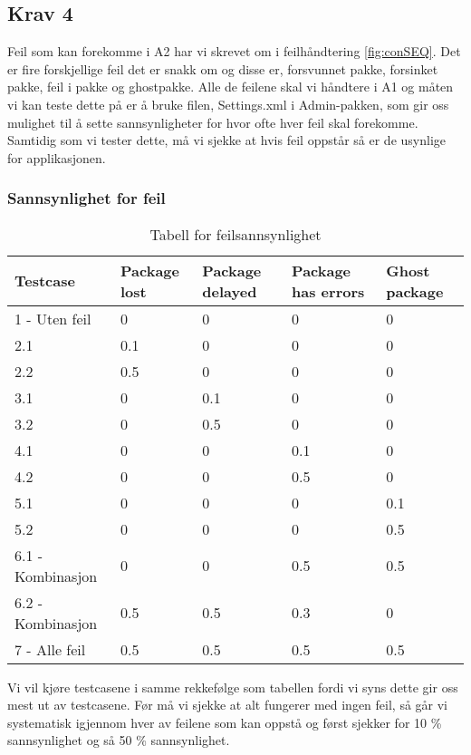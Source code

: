 \subsection{Krav 4}
Feil som kan forekomme i A2 har vi skrevet om i feilhåndtering \ref{fig:conSEQ}. Det er fire forskjellige feil det er snakk om og disse er, forsvunnet pakke, forsinket pakke, feil i pakke og ghostpakke. 
Alle de feilene skal vi håndtere i A1 og måten vi kan teste dette på er å bruke filen, Settings.xml i Admin-pakken, som gir oss mulighet til å sette sannsynligheter for hvor ofte hver feil skal forekomme. Samtidig som vi tester dette, må vi sjekke at hvis feil oppstår så er de usynlige for applikasjonen.

\subsubsection{Sannsynlighet for feil}
\begin{table}[H]
\centering
\label{tab:feilsan}
\begin{tabular}{| l | l | l | l | l |}
\hline
Testcase & Package lost & Package delayed & Package has errors & Ghost package \\
\hline
1 - Uten feil & 0 & 0 & 0 & 0 \\
\hline
2.1 & 0.1 & 0 & 0 & 0 \\
\hline
2.2 & 0.5 & 0 & 0 & 0 \\
\hline
3.1 & 0 & 0.1 & 0 & 0 \\
\hline
3.2 & 0 & 0.5 & 0 & 0 \\
\hline
4.1 & 0 & 0 & 0.1 & 0 \\
\hline
4.2 & 0 & 0 & 0.5 & 0 \\
\hline
5.1 & 0 & 0 & 0 & 0.1 \\
\hline
5.2 & 0 & 0 & 0 & 0.5 \\
\hline
6.1 - Kombinasjon & 0 & 0 & 0.5 & 0.5 \\
\hline
6.2 - Kombinasjon & 0.5 & 0.5 & 0.3 & 0 \\
\hline
7 - Alle feil & 0.5 & 0.5 & 0.5 & 0.5 \\
\hline
\end{tabular}
\caption{Tabell for feilsannsynlighet}
\end{table}

Vi vil kjøre testcasene i samme rekkefølge som tabellen fordi vi syns dette gir oss mest ut av testcasene. Før må vi sjekke at alt fungerer med ingen feil, så går vi systematisk igjennom hver av feilene som kan oppstå og først sjekker for 10 \% sannsynlighet og så 50 \% sannsynlighet.

